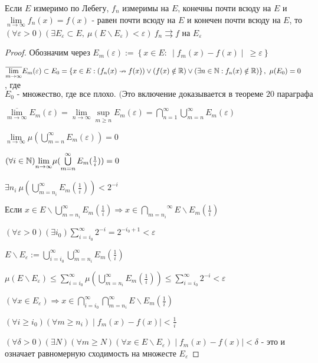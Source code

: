 \begin{theorem}[Д. Ф. Егоров]
    Если $E$ измеримо по Лебегу, $f_n$ измеримы на $E$, конечны почти всюду на $E$ и $\lim\limits_{n\to\infty} f_n(x)=f(x)$ - равен почти всюду на $E$ и конечен почти всюду на $E$, то ${(\forall \varepsilon >0)(\exists E_{\varepsilon}\subset E,\ \mu (E\backslash E_{\varepsilon})<\varepsilon)\ f_n \rightrightarrows f}$ на $E_{\varepsilon}$
\end{theorem}
\begin{proof}
Обозначим через $E_m(\varepsilon):=\left\{x\in E:\ \mid f_m(x)-f(x)\mid\ \geqslant \varepsilon \right\}$

${\overline{\lim\limits_{m\to\infty}}E_m(\varepsilon) \subset E_0=\left\{x\in E:(f_n(x)\nrightarrow f(x)) \vee (f(x) \notin \R) \vee (\exists n\in \N:f_n(x)\notin \R) \right\},\ \mu(E_0)=0}$, где $E_0\text{ - множество, где все плохо. (Это включение доказывается в теореме 20 параграфа 5).}$

$\overline{\lim\limits_{m\to\infty}}E_m(\varepsilon) =\lim\limits_{n\to\infty}\sup\limits_{m\geqslant n} E_m(\varepsilon)=\bigcap\limits_{n=1}^{\infty}\bigcup\limits_{m=n}^{\infty}E_m(\varepsilon)$

$\lim\limits_{n\to\infty}\mu(\bigcup\limits_{m=n}^{\infty}E_m(\varepsilon))=0$

$(\forall i \in \N) {\lim\limits_{n\to\infty}} \mu(\bigcup\limits_{m=n}^{\infty}E_m(\frac{1}{i}))=0$

$\exists n_i\ \mu(\bigcup\limits_{m=n_i}^{\infty}E_m(\frac{1}{i}))<2^{-i}$

$\text{Если }x \in E \backslash {\bigcup\limits_{m=n_i}^\infty}E_m(\frac{1}{i}) \Rightarrow x \in \overset{\infty}{\underset{m=n_i}{\bigcap}}E\backslash E_m(\frac{1}{i})$

$(\forall \varepsilon >0)(\exists i_0) \sum\limits_{i=i_0}^{\infty}2^{-i}=2^{-i_0+1}<\varepsilon$

$E\backslash E_{\varepsilon}:=\bigcup\limits_{i=i_0}^{\infty}\bigcup\limits_{m=n_i}^{\infty}E_m(\frac{1}{i})$

$\mu(E\backslash E_{\varepsilon})\leqslant \sum\limits_{i=i_0}^{\infty}\mu(\bigcup\limits_{m=n_i}^{\infty}E_m(\frac{1}{i}))\leqslant \sum\limits_{i=i_0}^{\infty}2^{-i}<\varepsilon$

$(\forall x \in E_{\varepsilon}) \Rightarrow x \in \bigcap\limits_{i=i_0}^{\infty}\bigcap\limits_{m=n_i}^{\infty}E\backslash E_m (\frac{1}{i})$

$(\forall i \geqslant i_0)(\forall m \geqslant n_i) \mid f_m(x)-f(x) \mid < \frac{1}{i}$

$(\forall \delta > 0)(\exists N)(\forall m \geqslant N)(\forall x \in E \backslash E_{\varepsilon}) \mid f_m(x)-f(x) \mid < \delta$ - это и означает равномерную сходимость на множесте $E_{\varepsilon}$
\end{proof}
